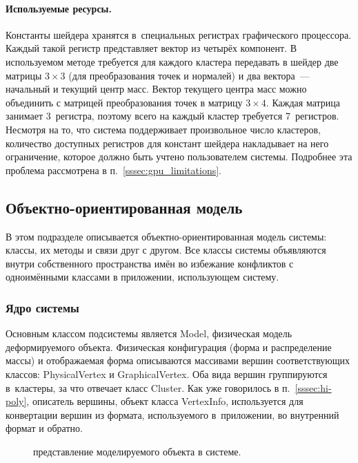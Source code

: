 \documentclass[a4paper, 14pt, titlepage]{extarticle}
\newcommand{\includefigure}[2]{
    \begin{figure}[!htb]
      \center{\texttt{[image: \#1]}}
      \caption{#2} \label{fig:#1}
    \end{figure}
  }
\begin{document}
        \paragraph{Используемые ресурсы.}
        Константы шейдера хранятся в~специальных регистрах графического процессора. Каждый такой регистр
        представляет вектор из четырёх компонент. В используемом методе требуется для каждого
        кластера передавать в шейдер две матрицы $3 \times 3$ (для преобразования точек и нормалей) и два
        вектора~--- начальный и текущий центр масс. Вектор текущего центра масс можно объединить с
        матрицей преобразования точек в матрицу $3 \times 4$. Каждая матрица занимает 3~регистра,
        поэтому всего на каждый кластер требуется 7~регистров. Несмотря на то, что система
        поддерживает произвольное число кластеров, количество доступных регистров для констант
        шейдера накладывает на него ограничение, которое должно быть учтено пользователем системы.
        Подробнее эта проблема рассмотрена в п.~\ref{sssec:gpu_limitations}.

    \subsection{Объектно-ориентированная модель}

      В этом подразделе описывается объектно-ориентированная модель системы: классы, их методы и
      связи друг с другом. Все классы системы объявляются внутри собственного пространства имён во
      избежание конфликтов с одноимёнными классами в приложении, использующем систему.

      \subsubsection{Ядро системы}

        Основным классом подсистемы является Model, физическая модель деформируемого объекта.
        Физическая конфигурация (форма и распределение массы) и отображаемая форма описываются
        массивами вершин соответствующих классов: PhysicalVertex и GraphicalVertex. Оба вида вершин
        группируются в~кластеры, за что отвечает класс Cluster. Как уже говорилось в
        п.~\ref{sssec:hi-poly}, описатель вершины, объект класса VertexInfo, используется для
        конвертации вершин из формата, используемого в~приложении, во внутренний формат и обратно.

        \includefigure{core-vertices}{представление моделируемого объекта в системе.}
\end{document}
